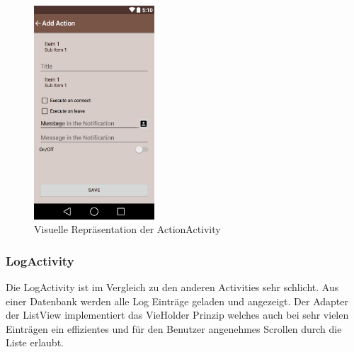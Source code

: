 \begin{figure}[ht]
	\centering
	\includegraphics[width=0.4\textwidth]{images/actionactivity.png}
	\caption{Visuelle Repräsentation der ActionActivity}
	\label{fig:actionctivity}
\end{figure}

\subsubsection{LogActivity}
Die LogActivity ist im Vergleich zu den anderen Activities sehr schlicht. Aus einer Datenbank werden alle Log Einträge geladen und angezeigt. Der Adapter der ListView implementiert das VieHolder Prinzip welches auch bei sehr vielen Einträgen ein effizientes und für den Benutzer angenehmes Scrollen durch die Liste erlaubt.


\newpage{}
